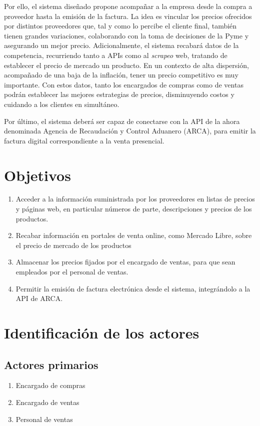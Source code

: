 \documentclass[11pt]{article}
\begin{document}
Por ello, 
el sistema diseñado propone acompañar a la empresa desde la compra a proveedor hasta la emisión de la factura.
La idea es vincular los precios ofrecidos por distintos proveedores que,
tal y como lo percibe el cliente final,
también tienen grandes variaciones,
colaborando con la toma de decisiones de la Pyme y asegurando un mejor precio.
Adicionalmente,
el sistema recabará datos de la competencia,
recurriendo tanto a APIs como al \textit{scrapeo} web,
tratando de establecer el precio de mercado un producto.
En un contexto de alta dispersión, 
acompañado de una baja de la inflación,
tener un precio competitivo es muy importante.
Con estos datos,
tanto los encargados de compras como de ventas podrán establecer las mejores estrategias de precios,
disminuyendo costos y cuidando a los clientes en simultáneo.

Por último,
el sistema deberá ser capaz de conectarse con la API de la ahora denominada
Agencia de Recaudación y Control Aduanero (ARCA),
para emitir la factura digital correspondiente a la venta presencial.

\section{Objetivos}

\begin{enumerate}
	\item Acceder a la información suministrada por los proveedores en listas de precios y páginas web, 
	en particular números de parte, descripciones y precios de los productos.
	\item Recabar información en portales de venta online, como Mercado Libre, sobre el precio de mercado de los productos 
	\item Almacenar los precios fijados por el encargado de ventas, para que sean empleados por el personal de ventas.
	\item Permitir la emisión de factura electrónica desde el sistema, integrándolo a la API de ARCA.
\end{enumerate}

\section{Identificación de los actores}

\subsection*{Actores primarios}
\begin{enumerate}
	\item Encargado de compras
	\item Encargado de ventas
	\item Personal de ventas
\end{enumerate}
\end{document}
